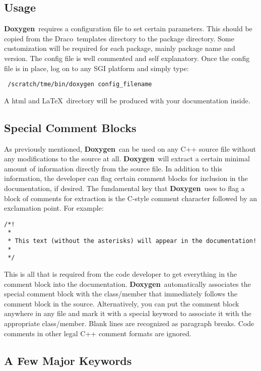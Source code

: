 \documentclass[11pt]{nmemo}
\newcommand{\draco}{{\normalfont\sffamily Draco}}
\newcommand{\doxy}{{\normalfont\bfseries Doxygen}}
\begin{document}
\subsection{Usage}
\doxy\ requires a configuration file to set certain parameters. This should
be copied from the \draco\ templates directory to the package directory. 
Some customization will
be required for each package, mainly package name and version. The
config file is well commented and self explanatory. Once the config file
is in place, log on to any SGI platform and simply type:\begin{verbatim}
 /scratch/tme/bin/doxygen config_filename
\end{verbatim}
A html and \LaTeX\ directory will be produced with your documentation 
inside.

\subsection{Special Comment Blocks}

As previously mentioned, \doxy\ can be used on any
C++ source file without any modifications to the source at all.
\doxy\ will extract a certain minimal amount of information directly
from the source file. In addition to this information, the developer
can flag certain comment blocks for inclusion in the documentation,
if desired.
The fundamental key that \doxy\ uses to flag a block of comments for
extraction is the C-style comment character followed by an exclamation
point. For example:
\begin{verbatim}
/*!
 *
 * This text (without the asterisks) will appear in the documentation!
 *
 */
\end{verbatim}
This is all that is required from the code developer to get everything
in the comment block into the documentation. \doxy\ automatically associates
the special comment block with the class/member that immediately follows the 
comment block in the source. Alternatively, you can put the comment block
anywhere in any file and mark it with a special keyword to associate it
with the appropriate class/member. Blank lines are recognized as paragraph
breaks. Code comments in other legal C++ comment formats are ignored.

\subsection{A Few Major Keywords}
\end{document}
